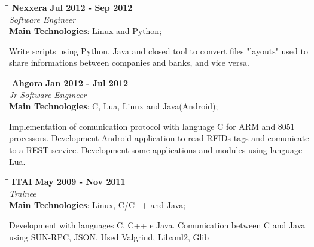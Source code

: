 \documentclass[margin]{res}
\begin{document}
\begin{resume}
    
   \begin{tabbing}
   \hspace{2.3in}\= \hspace{1.7in}\= \kill %
    \textbf{Nexxera}    \>\>\textbf{Jul 2012 - Sep 2012}\\
    \textit{Software Engineer}\\   
    \textbf{Main Technologies}: Linux and Python;
   \end{tabbing}\vspace{-20pt}      %
    \vspace{2mm}

    Write scripts using Python, Java and closed tool to convert files "layouts" used to share informations between companies and banks, and vice versa.
   
   \begin{tabbing}
   \hspace{2.3in}\= \hspace{1.5in}\= \kill %
    \textbf{Ahgora}    \>\>\textbf{Jan 2012 - Jul 2012}\\
    \textit{Jr Software Engineer}\\   
    \textbf{Main Technologies}: C, Lua, Linux and Java(Android);
   \end{tabbing}\vspace{-20pt}      %
    \vspace{2mm}
Implementation of comunication protocol with language C for ARM and 8051 processors.
Development Android application to read RFIDs tags and comunicate to a REST service.
Development some applications and modules using language Lua.

       
   \begin{tabbing}
   \hspace{2.3in}\= \hspace{1.5in}\= \kill %
    \textbf{ITAI}    \>\>\textbf{May 2009 - Nov 2011}\\
    \textit{Trainee}\\   
    \textbf{Main Technologies}: Linux, C/C++ and Java;
   \end{tabbing}\vspace{-20pt}      %
    \vspace{2mm}
       Development with languages C, C++ e Java. Comunication between C and Java using SUN-RPC, JSON. Used Valgrind, Libxml2, Glib


\end{resume}
\end{document}
